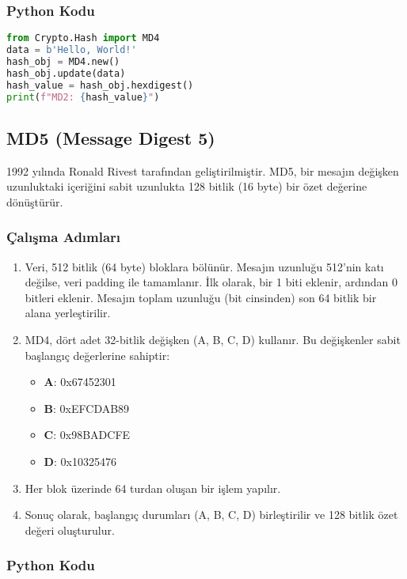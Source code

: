 \subsubsection{Python Kodu}

\begin{lstlisting}[language=Python]
from Crypto.Hash import MD4
data = b'Hello, World!'
hash_obj = MD4.new()
hash_obj.update(data)
hash_value = hash_obj.hexdigest()
print(f"MD2: {hash_value}")
\end{lstlisting}

\newpage

\subsection{MD5 (Message Digest 5)}

1992 yılında Ronald Rivest tarafından geliştirilmiştir. MD5, bir mesajın değişken uzunluktaki içeriğini sabit uzunlukta 128 bitlik (16 byte) bir özet değerine dönüştürür.

\subsubsection{Çalışma Adımları}

\begin{enumerate}
    \item Veri, 512 bitlik (64 byte) bloklara bölünür. Mesajın uzunluğu 512'nin katı değilse, veri padding ile tamamlanır. İlk olarak, bir 1 biti eklenir, ardından 0 bitleri eklenir. Mesajın toplam uzunluğu (bit cinsinden) son 64 bitlik bir alana yerleştirilir.
    \item MD4, dört adet 32-bitlik değişken (A, B, C, D) kullanır. Bu değişkenler sabit başlangıç değerlerine sahiptir:
    \begin{itemize}
        \item \textbf{A}: 0x67452301
        \item \textbf{B}: 0xEFCDAB89
        \item \textbf{C}: 0x98BADCFE
        \item \textbf{D}: 0x10325476
    \end{itemize}
    \item Her blok üzerinde 64 turdan oluşan bir işlem yapılır.
    \item Sonuç olarak, başlangıç durumları (A, B, C, D) birleştirilir ve 128 bitlik özet değeri oluşturulur.
\end{enumerate}

\subsubsection{Python Kodu}

